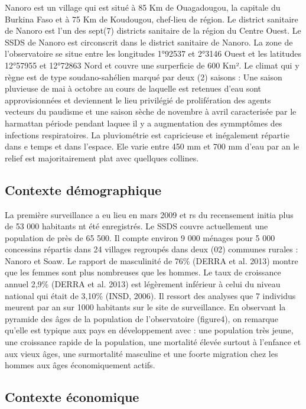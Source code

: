 \documentclass[12pt,a4paper]{report}
\begin{document}
			Nanoro est un village qui est situé à 85 Km de Ouagadougou, la capitale du Burkina Faso et à 75 Km de Koudougou, chef-lieu de région. Le district sanitaire de Nanoro est l'un des sept(7) districts sanitaire de la région du Centre Ouest. Le SSDS de Nanoro est circonscrit dans le district sanitaire de Nanoro. La zone de l'observatoire se situe entre les longitudes 1°92537 et 2°3146 Ouest et les latitudes 12°57955 et 12°72863 Nord et couvre une surperficie de 600 Km². Le climat qui y règne est de type soudano-sahélien marqué par deux (2) saisons : Une saison pluvieuse de mai à octobre au cours de laquelle est retenues d'eau sont approvisionnées et deviennent le lieu privilégié de prolifération des agents vecteurs du paudisme et une saison sèche de novembre à avril caracterisée par le harmattan période pendant laquee il y a augmentation des symmptômes des infections respiratoires. La pluviométrie est capricieuse et inégalement répartie dans e temps et dans l'espace. Ele varie entre 450 mm et 700 mm d'eau par an le relief est majoritairement plat avec quellques collines.
			
			\subsection{Contexte démographique}
			
			La première surveillance a eu lieu en mars 2009 et rs du recensement initia plus de 53 000 habitants nt été enregistrés. Le SSDS couvre actuellement une population de près de 65 500. Il compte environ 9 000 ménages pour 5 000 concessins répartis dans 24 villages regroupés dans deux (02) communes rurales : Nanoro et Soaw. Le rapport de masculinité de 76\% (DERRA et al. 2013) montre que les femmes sont plus nombreuses que les hommes. Le taux de croissance annuel 2,9\% (DERRA et al. 2013) est légèrement inférieur à celui du niveau national qui était de 3,10\% (INSD, 2006). Il ressort des analyses que 7 individus meurent par an sur 1000 habitants sur le site de surveillance. En observant la pyramide des âges de la population de l'observatoire (figure4), on remarque qu'elle est typique aux pays en développement avec : une population très jeune, une croissance rapide de la population, une mortalité élevée surtout à l'enfance et aux vieux âges, une surmortalité masculine et une foorte migration chez les hommes aux âges économiquement actifs.
			
			\subsection{Contexte économique}
			
\end{document}
